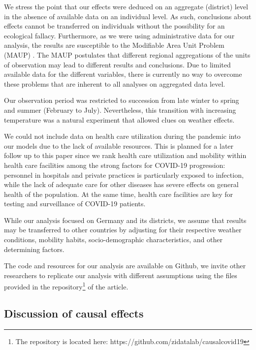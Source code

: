 \documentclass[10pt,letterpaper]{article}
\begin{document}
We stress the point that our effects were deduced on an aggregate (district) level in the absence of available data on an individual level. As such, conclusions about effects cannot be transferred on individuals without the possibility for an ecological fallacy. Furthermore, as we were using administrative data for our analysis, the results are susceptible to the Modifiable Area Unit Problem (MAUP) \cite{Openshaw1984}. The MAUP postulates that different regional aggregations of the units of observation may lead to different results and conclusions. Due to limited available data for the different variables, there is currently no way to overcome these problems that are inherent to all analyses on aggregated data level.

Our observation period was restricted to succession from late winter to spring and summer (February to July). Nevertheless, this transition with increasing temperature was a natural experiment that allowed clues on weather effects.

We could not include data on health care utilization during the pandemic into our models due to the lack of available resources. This is planned for a later follow up to this paper since we rank health care utilization and mobility within health care facilities among the strong factors for COVID-19 progression: personnel in hospitals and private practices is particularly exposed to infection, while the lack of adequate care for other diseases has severe effects on general health of the population. At the same time, health care facilities are key for testing and surveillance of COVID-19 patients.

While our analysis focused on Germany and its districts, we assume that results may be transferred to other countries by adjusting for their respective weather conditions, mobility habits, socio-demographic characteristics, and other determining factors.

The code and resources for our analysis are available on Github, we invite other researchers to replicate our analysis with different assumptions using the files provided in the repository\footnote{The repository is located here: https://github.com/zidatalab/causalcovid19} of the article.

\subsection*{Discussion of causal
effects}\label{discussion-of-causal-effects}
\end{document}
